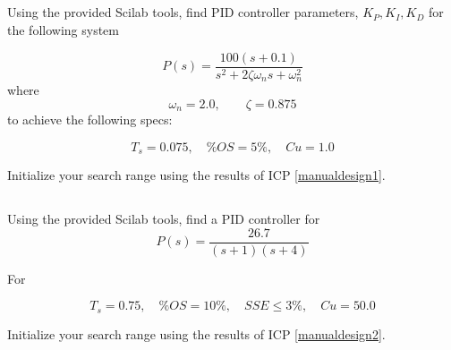 \documentclass{article}	%
\begin{document}
\subsection{}
Using the provided Scilab tools, find PID controller parameters, $K_P, K_I, K_D$ for the following system

\[
P(s) = \frac  {100(s+0.1)}   {s^2+2\zeta\omega_ns + \omega_n^2}
\]
where
\[
\omega_n = 2.0, \qquad \zeta = 0.875
\]
to achieve the following specs:

\[
T_s = 0.075, \quad \%OS = 5\%, \quad Cu = 1.0
\]

Initialize your search range using the results of ICP \ref{manualdesign1}.

%
%
%
%
%
%
%
%
%
%
\subsection{}


Using the provided Scilab tools, find a PID controller for
\[
P(s) = \frac  {26.7}{(s+1)(s+4)}
\]

For

\[
T_s = 0.75, \quad \%OS = 10\%,\quad SSE \leq 3\%, \quad Cu = 50.0
\]

Initialize your search range using the results of ICP \ref{manualdesign2}.

%
%
%
%
%
%
%
%
\end{document}
